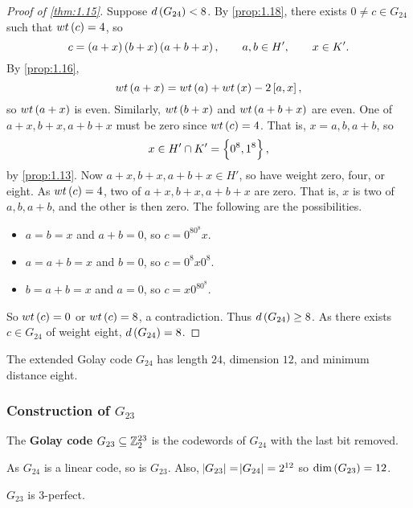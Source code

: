\begin{proof}[Proof of \ref{thm:1.15}]
Suppose $ d\br{G_{24}} < 8 $. By \ref{prop:1.18}, there exists $ 0 \ne c \in G_{24} $ such that $ wt\br{c} = 4 $, so
$$ c = \br{a + x}\br{b + x}\br{a + b + x}, \qquad a, b \in H', \qquad x \in K'. $$
By \ref{prop:1.16},
$$ wt\br{a + x} = wt\br{a} + wt\br{x} - 2\sbr{a, x}, $$
so $ wt\br{a + x} $ is even. Similarly, $ wt\br{b + x} $ and $ wt\br{a + b + x} $ are even. One of $ a + x, b + x, a + b + x $ must be zero since $ wt\br{c} = 4 $. That is, $ x = a, b, a + b $, so
$$ x \in H' \cap K' = \cbr{0^8, 1^8}, $$
by \ref{prop:1.13}. Now $ a + x, b + x, a + b + x \in H' $, so have weight zero, four, or eight. As $ wt\br{c} = 4 $, two of $ a + x, b + x, a + b + x $ are zero. That is, $ x $ is two of $ a, b, a + b $, and the other is then zero. The following are the possibilities.
\begin{itemize}
\item $ a = b = x $ and $ a + b = 0 $, so $ c = 0^80^8x $.
\item $ a = a + b = x $ and $ b = 0 $, so $ c = 0^8x0^8 $.
\item $ b = a + b = x $ and $ a = 0 $, so $ c = x0^80^8 $.
\end{itemize}
So $ wt\br{c} = 0 $ or $ wt\br{c} = 8 $, a contradiction. Thus $ d\br{G_{24}} \ge 8 $. As there exists $ c \in G_{24} $ of weight eight, $ d\br{G_{24}} = 8 $.
\end{proof}

\begin{theorem}
The extended Golay code $ G_{24} $ has length $ 24 $, dimension $ 12 $, and minimum distance eight.
\end{theorem}

\pagebreak

\subsubsection{Construction of $ G_{23} $}

\begin{definition*}
The \textbf{Golay code} $ G_{23} \subseteq \mathbb{Z}_2^{23} $ is the codewords of $ G_{24} $ with the last bit removed.
\end{definition*}

As $ G_{24} $ is a linear code, so is $ G_{23} $. Also, $ \abs{G_{23}} = \abs{G_{24}} = 2^{12} $ so $ \dim\br{G_{23}} = 12 $.

\begin{theorem}
$ G_{23} $ is $ 3 $-perfect.
\end{theorem}

